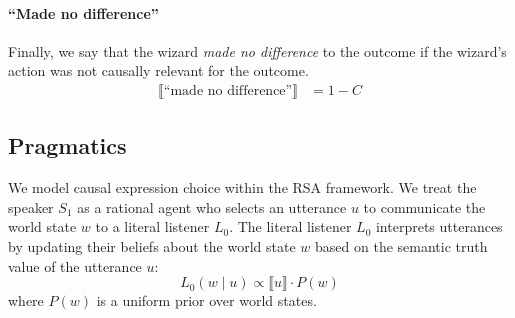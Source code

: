 \documentclass[10pt,letterpaper]{article}
\begin{document}
\paragraph{``Made no difference''}
Finally, we say that the wizard \emph{made no difference} to the outcome if the wizard's action was not causally relevant for the outcome.
\begin{align}
    \llbracket \text{``made no difference''} \rrbracket &= 1 - C
\end{align}


\subsection{Pragmatics}






We model causal expression choice within the RSA framework. 
We treat the speaker $S_1$ as a rational agent who selects an utterance $u$ to communicate the world state $w$ to a literal listener $L_0$.
The literal listener $L_0$ interprets utterances by updating their beliefs about the world state $w$ based on the semantic truth value of the utterance $u$:
\begin{equation}
    L_0(w \mid u) \propto \llbracket u \rrbracket \cdot P(w)
\end{equation}
where $P(w)$ is a uniform prior over world states.
\end{document}

